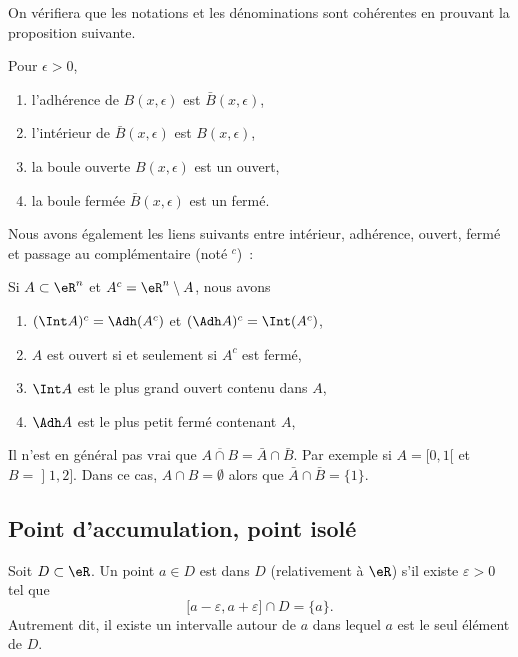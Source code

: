 On vérifiera que les notations et les dénominations sont cohérentes en prouvant la proposition suivante.
\begin{proposition}Pour $\epsilon > 0$,
  \begin{enumerate}
  \item l'adhérence de $B(x,\epsilon)$ est $\bar B(x,\epsilon)$,
  \item l'intérieur de $\bar B(x,\epsilon)$ est $B(x,\epsilon)$,
  \item la boule ouverte $B(x,\epsilon)$ est un ouvert,
  \item la boule fermée $\bar B(x,\epsilon)$ est un fermé.
  \end{enumerate}
\end{proposition}

Nous avons également les liens suivants entre intérieur, adhérence, ouvert, fermé et passage au complémentaire (noté ${}^c$)~:
\begin{proposition}
Si $A \subset \eR^n$ et $A^c = \eR^n\setminus A$, nous
  avons
  \begin{enumerate}
  \item $(\Int A)^c = \Adh (A^c)$ et $(\Adh A)^c = \Int
    (A^c)$,
  \item $A$ est ouvert si et seulement si $A^c$ est fermé,
  \item $\Int A$ est le plus grand ouvert contenu dans $A$,
  \item $\Adh A$ est le plus petit fermé contenant $A$,
  \end{enumerate}
\end{proposition}

\begin{example} \label{ExBFLooUNyvbw}
    Il n'est en général pas vrai que \( \overline{ A\cap B }=\bar A\cap \bar B\). Par exemple si \( A=\mathopen[ 0 , 1 [\) et \( B=\mathopen] 1 , 2 \mathclose]\). Dans ce cas, \( A\cap B=\emptyset\) alors que \( \bar A\cap\bar B=\{ 1 \}\).
\end{example}

\subsection{Point d'accumulation, point isolé}

Soit $D\subset\eR$. Un point $a\in D$ est  dans $D$ (relativement à $\eR$) s'il existe $\varepsilon>0$ tel que 
\begin{equation}
	\mathopen[ a-\varepsilon , a+\varepsilon \mathclose]\cap D=\{ a \}.
\end{equation}
Autrement dit, il existe un intervalle autour de $a$ dans lequel $a$ est le seul élément de $D$.

